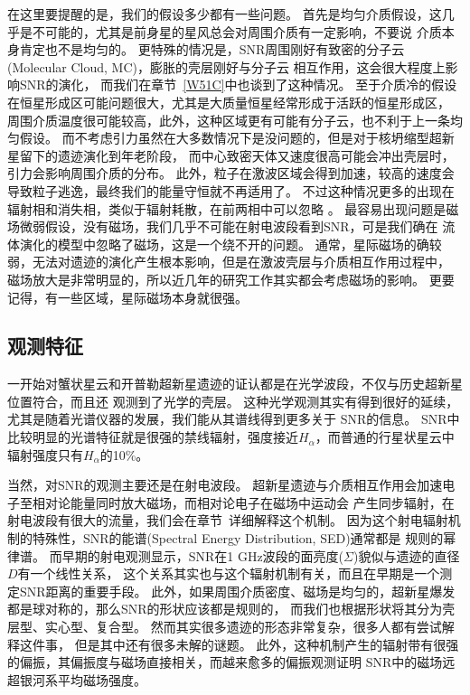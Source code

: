 在这里要提醒的是，我们的假设多少都有一些问题。
首先是均匀介质假设，这几乎是不可能的，尤其是前身星的星风总会对周围介质有一定影响，不要说
介质本身肯定也不是均匀的。
更特殊的情况是，SNR周围刚好有致密的分子云(Molecular Cloud, MC)，膨胀的壳层刚好与分子云
相互作用，这会很大程度上影响SNR的演化\citep{1972PhDT........47S, Orlando2008, Zhang2017}，
而我们在章节~\ref{W51C}中也谈到了这种情况。
至于介质冷的假设在恒星形成区可能问题很大，尤其是大质量恒星经常形成于活跃的恒星形成区，
周围介质温度很可能较高，此外，这种区域更有可能有分子云，也不利于上一条均匀假设。
而不考虑引力虽然在大多数情况下是没问题的，但是对于核坍缩型超新星留下的遗迹演化到年老阶段，
而中心致密天体又速度很高可能会冲出壳层时，引力会影响周围介质的分布。
此外，粒子在激波区域会得到加速，较高的速度会导致粒子逃逸，最终我们的能量守恒就不再适用了。
不过这种情况更多的出现在辐射相和消失相，类似于辐射耗散，在前两相中可以忽略
\citep{1967IAUS...31..117K}。
最容易出现问题是磁场微弱假设，没有磁场，我们几乎不可能在射电波段看到SNR，可是我们确在
流体演化的模型中忽略了磁场，这是一个绕不开的问题。
通常，星际磁场的确较弱，无法对遗迹的演化产生根本影响，但是在激波壳层与介质相互作用过程中，
磁场放大是非常明显的，所以近几年的研究工作其实都会考虑磁场的影响。
更要记得，有一些区域，星际磁场本身就很强。

\subsection{观测特征}
一开始对蟹状星云和开普勒超新星遗迹的证认都是在光学波段，不仅与历史超新星位置符合，而且还
观测到了光学的壳层。
这种光学观测其实有得到很好的延续，尤其是随着光谱仪器的发展，我们能从其谱线得到更多关于
SNR的信息。
SNR中比较明显的光谱特征就是很强的禁线辐射，强度接近$H_\alpha$，而普通的行星状星云中
辐射强度只有$H_\alpha$的10\%。

当然，对SNR的观测主要还是在射电波段。
超新星遗迹与介质相互作用会加速电子至相对论能量同时放大磁场，而相对论电子在磁场中运动会
产生同步辐射，在射电波段有很大的流量，我们会在章节~\label{TheoryDSACR}详细解释这个机制。
因为这个射电辐射机制的特殊性，SNR的能谱(Spectral Energy Distribution, SED)通常都是
规则的幂律谱。
而早期的射电观测显示，SNR在1 GHz波段的面亮度($\Sigma$)貌似与遗迹的直径$D$有一个线性关系，
这个关系其实也与这个辐射机制有关，而且在早期是一个测定SNR距离的重要手段。
此外，如果周围介质密度、磁场是均匀的，超新星爆发都是球对称的，那么SNR的形状应该都是规则的，
而我们也根据形状将其分为壳层型、实心型、复合型。
然而其实很多遗迹的形态非常复杂\citep{West2016}，很多人都有尝试解释这件事\citet{Zhang2018}，
但是其中还有很多未解的谜题。
此外，这种机制产生的辐射带有很强的偏振，其偏振度与磁场直接相关，而越来愈多的偏振观测证明
SNR中的磁场远超银河系平均磁场强度。

